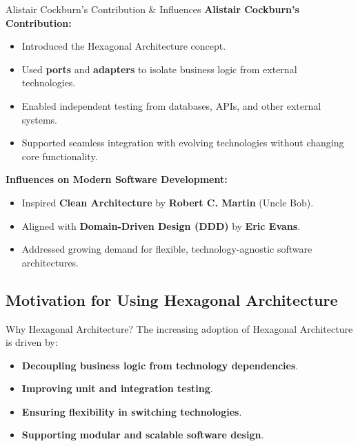 \documentclass[aspectratio=169, table]{beamer}
\begin{document}
\begin{frame}[fragile]{Alistair Cockburn’s Contribution \& Influences}
	\vspace{20pt}
	\textbf{Alistair Cockburn’s Contribution:}
	\begin{itemize}
		\item Introduced the Hexagonal Architecture concept.
		\item Used \textbf{ports} and \textbf{adapters} to isolate business logic from external technologies.
		\item Enabled independent testing from databases, APIs, and other external systems.
		\item Supported seamless integration with evolving technologies without changing core functionality.
	\end{itemize}
	
	\textbf{Influences on Modern Software Development:}
	\begin{itemize}
		\item Inspired \textbf{Clean Architecture} by \textbf{Robert C. Martin} (Uncle Bob).
		\item Aligned with \textbf{Domain-Driven Design (DDD)} by \textbf{Eric Evans}.
		\item Addressed growing demand for flexible, technology-agnostic software architectures.
	\end{itemize}
\end{frame}


\subsection{Motivation for Using Hexagonal Architecture}

\begin{frame}[fragile]{Why Hexagonal Architecture?}
	\vspace{20pt}
	The increasing adoption of Hexagonal Architecture is driven by:
	\begin{itemize}
		\item \textbf{Decoupling business logic from technology dependencies}.
		\item \textbf{Improving unit and integration testing}.
		\item \textbf{Ensuring flexibility in switching technologies}.
		\item \textbf{Supporting modular and scalable software design}.
	\end{itemize}
\end{frame}
\end{document}
